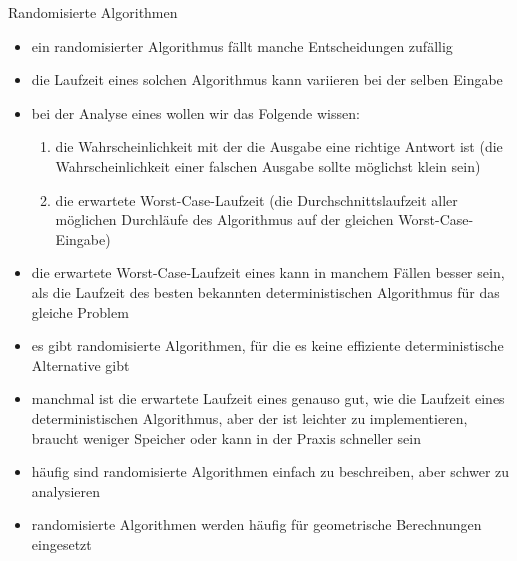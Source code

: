 \begin{TOP}{Randomisierte Algorithmen}
\vspace*{-2\baselineskip}\begin{itemize}[itemsep=-1pt]
	\item ein randomisierter Algorithmus fällt manche Entscheidungen zufällig
	\item die Laufzeit eines solchen Algorithmus kann variieren bei der selben Eingabe
	\item bei der Analyse eines  wollen wir das Folgende wissen:
		\begin{enumerate}
			\item die Wahrscheinlichkeit mit der die Ausgabe eine richtige Antwort ist (die Wahrscheinlichkeit einer falschen Ausgabe sollte möglichst klein sein)
			\item die erwartete Worst-Case-Laufzeit (die Durchschnittslaufzeit aller möglichen Durchläufe des Algorithmus auf der gleichen Worst-Case-Eingabe)
		\end{enumerate}
	\item die erwartete Worst-Case-Laufzeit eines  kann in manchem Fällen besser sein, als die Laufzeit des besten bekannten deterministischen Algorithmus für das gleiche Problem
	\item es gibt randomisierte Algorithmen, für die es keine effiziente deterministische Alternative gibt
	\item manchmal ist die erwartete Laufzeit eines  genauso gut, wie die Laufzeit eines deterministischen Algorithmus, aber der  ist leichter zu implementieren, braucht weniger Speicher oder kann in der Praxis schneller sein
	\item häufig sind randomisierte Algorithmen einfach zu beschreiben, aber schwer zu analysieren
	\item randomisierte Algorithmen werden häufig für geometrische Berechnungen eingesetzt
\end{itemize}
\end{TOP}